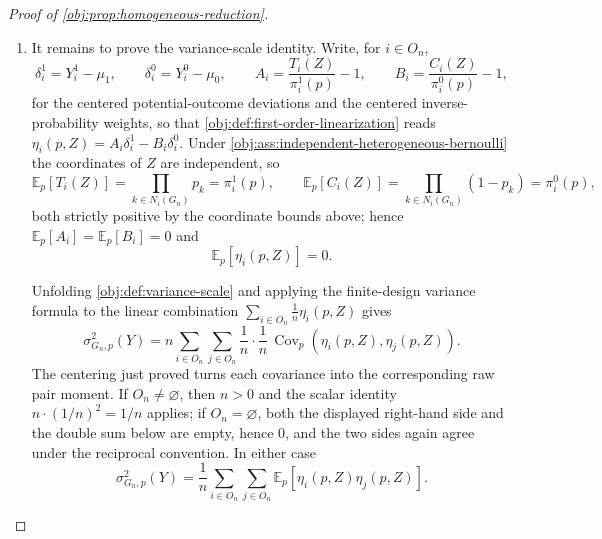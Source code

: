 \begin{proof}[Proof of \cref{obj:prop:homogeneous-reduction}]
\begin{enumerate}
\item It remains to prove the variance-scale identity. Write, for \(i\in O_n\),
\[
\delta_i^1=Y_i^1-\mu_1,\qquad \delta_i^0=Y_i^0-\mu_0,
\qquad
A_i=\frac{T_i(Z)}{\pi_i^1(p)}-1,
\qquad
B_i=\frac{C_i(Z)}{\pi_i^0(p)}-1,
\]
for the centered potential-outcome deviations and the centered inverse-probability weights, so that \cref{obj:def:first-order-linearization} reads \(\eta_i(p,Z)=A_i\delta_i^1-B_i\delta_i^0\). Under \cref{obj:ass:independent-heterogeneous-bernoulli} the coordinates of \(Z\) are independent, so
\[
\mathbb E_p\!\left[T_i(Z)\right]=\prod_{k\in N_i(G_n)}p_k=\pi_i^1(p),
\qquad
\mathbb E_p\!\left[C_i(Z)\right]=\prod_{k\in N_i(G_n)}(1-p_k)=\pi_i^0(p),
\]
both strictly positive by the coordinate bounds above; hence \(\mathbb E_p[A_i]=\mathbb E_p[B_i]=0\) and
\[
\mathbb E_p\!\left[\eta_i(p,Z)\right]=0 .
\]

Unfolding \cref{obj:def:variance-scale} and applying the finite-design variance formula to the linear combination \(\sum_{i\in O_n}\frac1n\eta_i(p,Z)\) gives
\[
\sigma_{G_n,p}^2(Y)
= n\sum_{i\in O_n}\sum_{j\in O_n}
 \frac1n\cdot\frac1n\,
 \operatorname{Cov}_p\!\left(\eta_i(p,Z),\eta_j(p,Z)\right).
\]
The centering just proved turns each covariance into the corresponding raw pair moment. If \(O_n\neq\varnothing\), then \(n>0\) and the scalar identity \(n\cdot(1/n)^2=1/n\) applies; if \(O_n=\varnothing\), both the displayed right-hand side and the double sum below are empty, hence \(0\), and the two sides again agree under the reciprocal convention. In either case
\[
\sigma_{G_n,p}^2(Y)
=\frac1n\sum_{i\in O_n}\sum_{j\in O_n}
\mathbb E_p\!\left[\eta_i(p,Z)\eta_j(p,Z)\right].
\]


\end{enumerate}
\end{proof}
